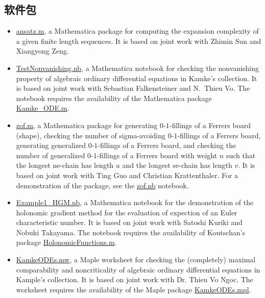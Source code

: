 \documentclass[a4paper,12pt]{article}
\begin{document}
\begin{CJK*}{UTF8}{gbsn}
\section*{\Large{软件包}}
\begin{itemize}
\item \href{https://yzhang1616.github.io/complexity/ansatz.m}{ansatz.m}, 
a Mathematica package for computing the expansion complexity of a given finite length sequences. 
It is based on joint work with Zhimin Sun and Xiangyong Zeng.
  \item \href{https://yzhang1616.github.io/TestNonvanishing.nb}{TestNonvanishing.nb}, 
    a Mathematica notebook for checking the nonvanishing property of algebraic ordinary
    differential equations in Kamke's collection. It is based on joint work
    with Sebastian Falkensteiner and N.\ Thieu Vo. 
    The notebook requires the availability of the Mathematica package \href{https://yzhang1616.github.io/Kamke_ODE.m}{Kamke\_ODE.m}.
  \item \href{https://yzhang1616.github.io/zof/zof.m}{zof.m}, a Mathematica package for generating $0$-$1$-fillings 
  of a Ferrers board (shape), checking the number of
    sigma-avoiding $0$-$1$-fillings of a Ferrers board, 
     generating generalized $0$-$1$-fillings of a Ferrers board, 
     and checking the number of generalized $0$-$1$-fillings of a Ferrers board with weight $n$
    such that the longest ne-chain has length $u$ 
    and the longest se-chain has length $v$. It is based on joint work with Ting
    Guo and Christian Krattenthaler. For a demonstration of the package,
    see the \href{https://yzhang1616.github.io/zof/zof.nb}{zof.nb} notebook. 
\item \href{https://yzhang1616.github.io/ec1/Example1_HGM.nb}{Example1\_HGM.nb}, a Mathematica notebook for
    the demonstration of the holonomic gradient method for the evaluation of
    expection of an Euler characteristic number. It is based on joint work
    with Satoshi Kuriki and Nobuki Takayama. 
    The notebook requires the availability of Koutschan's package 
     \href{http://www.risc.jku.at/research/combinat/software/ergosum/RISC/HolonomicFunctions.html}{HolonomicFunctions.m}.
 \item \href{https://yzhang1616.github.io/KamkeODEs.mw}{KamkeODEs.mw}, a Maple worksheet for 
     checking the (completely) maximal comparability and noncriticality of algebraic
     ordinary differential equations in
     Kample's collection. It is based on joint work with Dr. Thieu Vo Ngoc. 
     The worksheet requires the availability of the Maple package \href{https://yzhang1616.github.io/KamkeODEs.mpl}{KamkeODEs.mpl}.

\end{itemize}
\end{CJK*}
\end{document}
